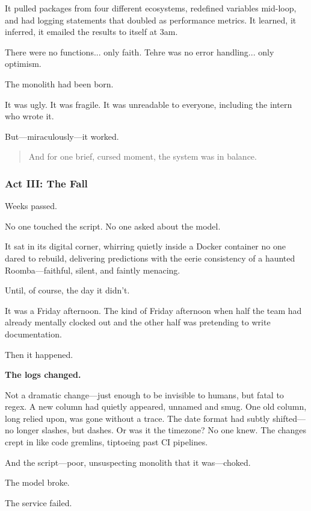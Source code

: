 It pulled packages from four different ecosystems, redefined variables mid-loop, and had logging statements that doubled as performance metrics. It learned, it inferred, it emailed the results to itself at 3am.

There were no functions... only faith.  
Tehre was no error handling... only optimism.

The monolith had been born.

It was ugly. It was fragile. It was unreadable to everyone, including the intern who wrote it.

But—miraculously—it worked.

\begin{quote}
And for one brief, cursed moment, the system was in balance.
\end{quote}



\vspace{1em}
\subsubsection{Act III: The Fall}

Weeks passed.

No one touched the script. No one asked about the model.

It sat in its digital corner, whirring quietly inside a Docker container no one dared to rebuild, delivering predictions with the eerie consistency of a haunted Roomba—faithful, silent, and faintly menacing.

Until, of course, the day it didn’t.

It was a Friday afternoon. The kind of Friday afternoon when half the team had already mentally clocked out and the other half was pretending to write documentation.

Then it happened.

\textbf{The logs changed.}

Not a dramatic change—just enough to be invisible to humans, but fatal to regex. A new column had quietly appeared, unnamed and smug. One old column, long relied upon, was gone without a trace. The date format had subtly shifted—no longer slashes, but dashes. Or was it the timezone? No one knew. The changes crept in like code gremlins, tiptoeing past CI pipelines.

And the script—poor, unsuspecting monolith that it was—choked.

The model broke.

The service failed.

